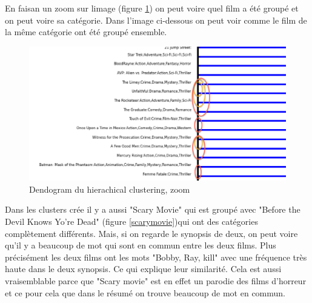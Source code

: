 	En faisan un zoom sur limage (figure \ref{zoom}) on peut voire quel film a été groupé et on peut voire sa catégorie. Dans l'image ci-dessous on peut voir comme le film de la même catégorie ont été groupé ensemble.
		\begin{figure}[h]
		  \centering
		    \includegraphics[width=1\linewidth]{img/zoom.png}
		  \caption{Dendogram du hierachical clustering, zoom}
		  \label{zoom}
		\end{figure}
		\newpage
	Dans les clusters crée il y a aussi "Scary Movie" qui est groupé avec "Before the Devil Knows Yo're Dead" (figure \ref{scarymovie})qui ont des catégories complètement différents. Mais, si on regarde le synopsis de deux, on peut voire qu’il y a beaucoup de mot qui sont en commun entre les deux films. Plus précisément les deux films ont les mots "Bobby, Ray, kill" avec une fréquence très haute dans le deux synopsis. Ce qui explique leur similarité. Cela est aussi vraisemblable parce que "Scary movie" est en effet un parodie des films d'horreur et ce pour cela que dans le résumé on trouve beaucoup de mot en commun. 	
	 

